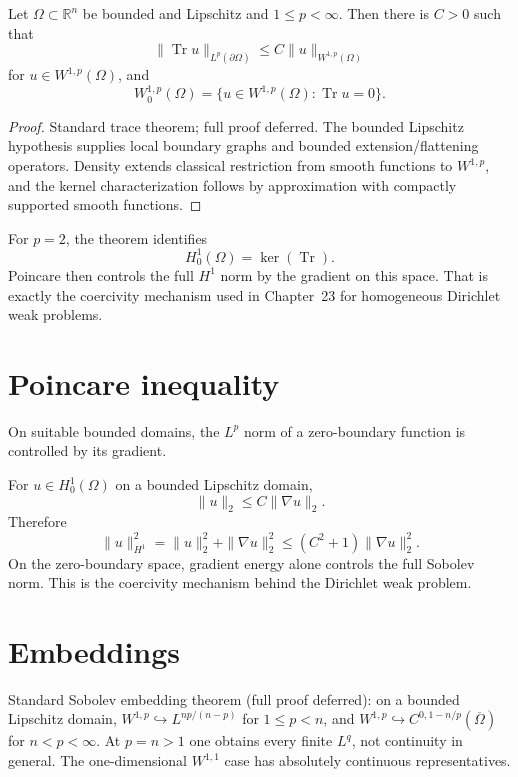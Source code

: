 \begin{theorem}\label{thm:iii21-trace}
Let \(\Omega\subset\mathbb R^n\) be bounded and Lipschitz and
\(1\le p<\infty\). Then there is \(C>0\) such that
\[
\|\operatorname{Tr}u\|_{L^p(\partial\Omega)}
\le C\|u\|_{W^{1,p}(\Omega)}
\]
for \(u\in W^{1,p}(\Omega)\), and
\[
W_0^{1,p}(\Omega)=
\{u\in W^{1,p}(\Omega):\operatorname{Tr}u=0\}.
\]
\begin{proof}
Standard trace theorem; full proof deferred. The bounded Lipschitz hypothesis
supplies local boundary graphs and bounded extension/flattening operators.
Density extends classical restriction from smooth functions to \(W^{1,p}\),
and the kernel characterization follows by approximation with compactly
supported smooth functions.
\end{proof}
\end{theorem}

\begin{remark}
For \(p=2\), the theorem identifies
\[
H_0^1(\Omega)=\ker(\operatorname{Tr}).
\]
Poincare then controls the full \(H^1\) norm by the gradient on this space.
That is exactly the coercivity mechanism used in Chapter~23 for homogeneous
Dirichlet weak problems.
\end{remark}

\section{Poincare inequality}
On suitable bounded domains, the $L^p$ norm of a zero-boundary function is controlled by its gradient.


\begin{example}\label{ex:iii21-expand-02}
For \(u\in H_0^1(\Omega)\) on a bounded Lipschitz domain,
\[
\|u\|_2\le C\|\nabla u\|_2.
\]
Therefore
\[
\|u\|_{H^1}^2=\|u\|_2^2+\|\nabla u\|_2^2
\le (C^2+1)\|\nabla u\|_2^2.
\]
On the zero-boundary space, gradient energy alone controls the full Sobolev
norm. This is the coercivity mechanism behind the Dirichlet weak problem.
\end{example}
\section{Embeddings}
Standard Sobolev embedding theorem (full proof deferred): on a bounded Lipschitz domain, $W^{1,p}\hookrightarrow L^{np/(n-p)}$ for $1\le p<n$, and $W^{1,p}\hookrightarrow C^{0,1-n/p}(\overline\Omega)$ for $n<p<\infty$. At $p=n>1$ one obtains every finite $L^q$, not continuity in general. The one-dimensional $W^{1,1}$ case has absolutely continuous representatives.


